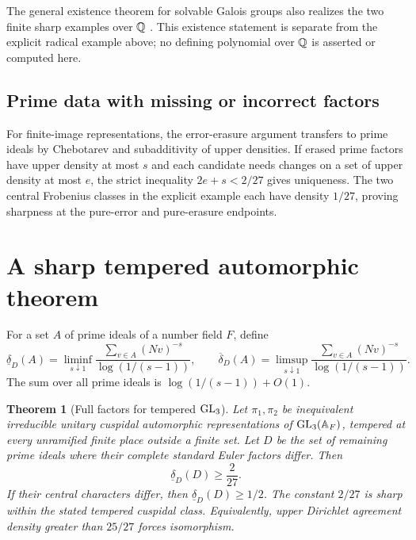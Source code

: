 \documentclass[11pt]{article}
\newtheorem{theorem}{Theorem}[section]
\theoremstyle{definition}\newtheorem{definition}[theorem]{Definition}
\theoremstyle{remark}\newtheorem{remark}[theorem]{Remark}
\begin{document}
The general existence theorem for solvable Galois groups also realizes the two finite sharp examples over $\mathbb Q$ \cite{SchmidtWingberg}. This existence statement is separate from the explicit radical example above; no defining polynomial over $\mathbb Q$ is asserted or computed here.

\subsection{Prime data with missing or incorrect factors}

For finite-image representations, the error-erasure argument transfers to prime ideals by Chebotarev and subadditivity of upper densities. If erased prime factors have upper density at most $s$ and each candidate needs changes on a set of upper density at most $e$, the strict inequality $2e+s<2/27$ gives uniqueness. The two central Frobenius classes in the explicit example each have density $1/27$, proving sharpness at the pure-error and pure-erasure endpoints.

\section{A sharp tempered automorphic theorem}

For a set $A$ of prime ideals of a number field $F$, define
\[
 \underline\delta_D(A)=\liminf_{s\downarrow1}
 \frac{\sum_{v\in A}(Nv)^{-s}}{\log(1/(s-1))},
 \qquad
 \overline\delta_D(A)=\limsup_{s\downarrow1}
 \frac{\sum_{v\in A}(Nv)^{-s}}{\log(1/(s-1))}.
\]
The sum over all prime ideals is $\log(1/(s-1))+O(1)$.

\begin{theorem}[Full factors for tempered $\mathrm{GL}_3$]\label{thm:auto}
Let $\pi_1,\pi_2$ be inequivalent irreducible unitary cuspidal automorphic representations of $\mathrm{GL}_3(\mathbb A_F)$, tempered at every unramified finite place outside a finite set. Let $D$ be the set of remaining prime ideals where their complete standard Euler factors differ. Then
\begin{equation}\label{eq:auto}
 \underline\delta_D(D)\ge\frac{2}{27}.
\end{equation}
If their central characters differ, then $\underline\delta_D(D)\ge1/2$. The constant $2/27$ is sharp within the stated tempered cuspidal class. Equivalently, upper Dirichlet agreement density greater than $25/27$ forces isomorphism.
\end{theorem}
\end{document}
